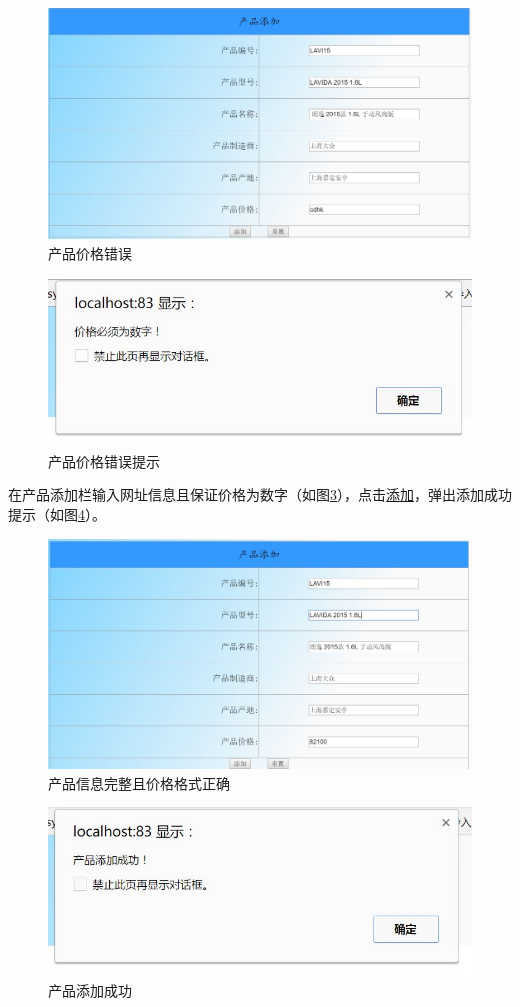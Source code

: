 \begin{figure}[H]
\centering
\includegraphics[width=0.8\linewidth]{figure/prod_add_price_error}
\caption{产品价格错误}
\label{fig:prod_add_price_error}
\end{figure}

\begin{figure}[H]
\centering
\includegraphics[width=0.8\linewidth]{figure/prod_add_price_error_alert}
\caption{产品价格错误提示}
\label{fig:prod_add_price_error_alert}
\end{figure}

在产品添加栏输入网址信息且保证价格为数字（如图\ref{fig:prod_add_sucess_inf}），点击\underline{添加}，弹出添加成功提示（如图\ref{fig:prod_add_sucess}）。
\begin{figure}[H]
\centering
\includegraphics[width=0.8\linewidth]{figure/prod_add_sucess_inf}
\caption{产品信息完整且价格格式正确}
\label{fig:prod_add_sucess_inf}
\end{figure}
\begin{figure}[H]
\centering
\includegraphics[width=0.8\linewidth]{figure/prod_add_sucess}
\caption{产品添加成功}
\label{fig:prod_add_sucess}
\end{figure}

